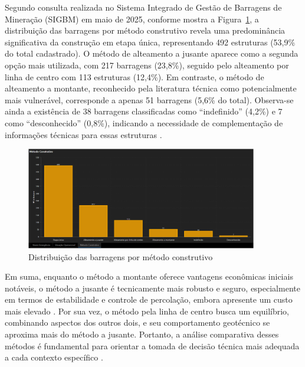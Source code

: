 Segundo consulta realizada no Sistema Integrado de Gestão de Barragens de Mineração (SIGBM) em maio de 2025, conforme mostra a Figura~\ref{fig:distribuicao_barragens}, a distribuição das barragens por método construtivo revela uma predominância significativa da construção em etapa única, representando 492 estruturas (53,9\% do total cadastrado). O método de alteamento a jusante aparece como a segunda opção mais utilizada, com 217 barragens (23,8\%), seguido pelo alteamento por linha de centro com 113 estruturas (12,4\%). Em contraste, o método de alteamento a montante, reconhecido pela literatura técnica como potencialmente mais vulnerável, corresponde a apenas 51 barragens (5,6\% do total). Observa-se ainda a existência de 38 barragens classificadas como ``indefinido'' (4,2\%) e 7 como ``desconhecido'' (0,8\%), indicando a necessidade de complementação de informações técnicas para essas estruturas \cite{anmsistema2020}.

\begin{figure}[!htb]
    \centering
    \includegraphics[width=0.9\textwidth]{figures/image21_distribuicao_barragens_por_metodo_atual.png}
    \caption{Distribuição das barragens por método construtivo}
    \label{fig:distribuicao_barragens}
\end{figure}

Em suma, enquanto o método a montante oferece vantagens econômicas iniciais notáveis, o método a jusante é tecnicamente mais robusto e seguro, especialmente em termos de estabilidade e controle de percolação, embora apresente um custo mais elevado \cite{desouzajunior2018}. Por sua vez, o método pela linha de centro busca um equilíbrio, combinando aspectos dos outros dois, e seu comportamento geotécnico se aproxima mais do método a jusante. Portanto, a análise comparativa desses métodos é fundamental para orientar a tomada de decisão técnica mais adequada a cada contexto específico \cite{araujo2006}.

